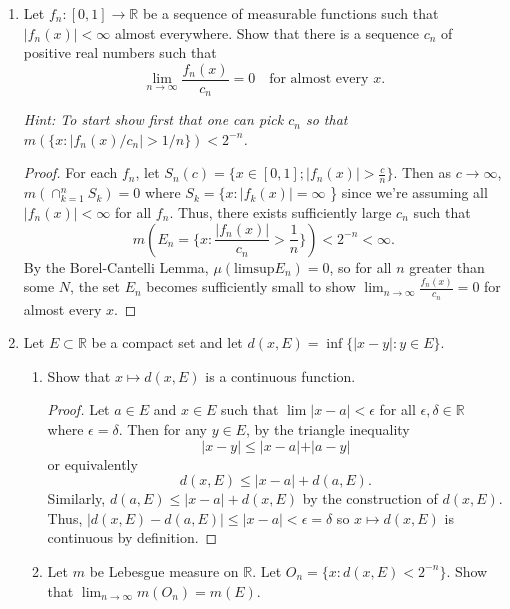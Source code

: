 \documentclass[12pt]{article}
\theoremstyle{definition}
\begin{document}
\begin{enumerate}
	\item Let $f_n : [0,1] \to \mathbb{R}$ be a sequence of measurable functions such that $|f_n(x)| < \infty$ almost everywhere. Show that there is a sequence $c_n$ of positive real numbers such that
	      \[
		      \lim_{n \to \infty} \frac{f_n(x)}{c_n} = 0 \quad \text{for almost every } x.
	      \]

	      \textit{Hint: To start show first that one can pick $c_n$ so that $m(\{x : |f_n(x)/c_n| > 1/n\}) < 2^{-n}$.}

	      \begin{proof}
		      For each $f_n$, let $S_n(c) = \{x \in [0,1]; \vert f_n(x) \vert > \frac{c}{n}\}$. Then
		      as $c \rightarrow \infty$, $m(\cap_{k=1}^n S_k) = 0$ where 
		      $S_k = \{x: \vert f_k(x)\vert  = \infty$ \} since we're assuming all $\vert f_n (x) \vert < \infty$ for all $f_n$. Thus, there exists sufficiently large $c_n$ such that 
		      $$m(E_n = \{x: \frac{\vert f_n(x)\vert}{c_n} > \frac{1}{n} \}) < 2^{-n} < \infty.$$
		      By the Borel-Cantelli Lemma, $\mu(\text{limsup}E_n) = 0$, so for all $n$ greater than
		      some $N$, the set $E_n$ becomes sufficiently small to show $\lim_{n\rightarrow \infty}\frac{f_n(x)}{c_n} = 0$ for almost every $x$.
	      \end{proof}

	\item Let $E \subset \mathbb{R}$ be a compact set and let $d(x, E) = \inf\{|x - y| : y \in E\}$.

	      \begin{enumerate}[label=(\roman*)]
		      \item Show that $x \mapsto d(x, E)$ is a continuous function.

		            \begin{proof}
				    Let $a \in E$ and $x \in E$ such that $\lim \vert x - a \vert < \epsilon$ for all $\epsilon, \delta \in \mathbb{R}$ where $\epsilon = \delta$. Then for any $y \in E$, by the triangle inequality
				    $$ \vert x - y \vert \leq \vert x - a \vert + \vert a - y \vert $$
				    or equivalently
				    $$ d(x, E) \leq \vert x - a\vert + d(a, E).$$
				Similarly, $d(a, E) \leq \vert x - a \vert + d(x, E)$ by the construction of $d(x, E)$. 
				Thus, $\vert d(x,E) - d(a, E) \vert \leq \vert x - a \vert < \epsilon = \delta$ so $x\mapsto d(x, E)$ is continuous by definition.

		            \end{proof}

		      \item Let $m$ be Lebesgue measure on $\mathbb{R}$. Let $O_n = \{x : d(x, E) < 2^{-n}\}$. Show that $\lim_{n \to \infty} m(O_n) = m(E)$.


\end{enumerate}
\end{enumerate}
\end{document}
